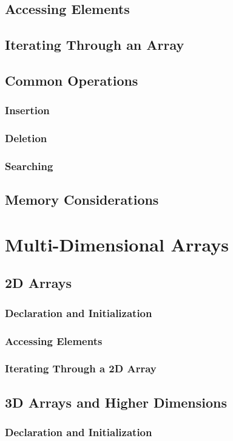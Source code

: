 \documentclass{book}
\begin{document}
	\subsection{Accessing Elements}
	\subsection{Iterating Through an Array}
	\subsection{Common Operations}
	\subsubsection{Insertion}
	\subsubsection{Deletion}
	\subsubsection{Searching}
	\subsection{Memory Considerations}
	
	\section{Multi-Dimensional Arrays}
	\subsection{2D Arrays}
	\subsubsection{Declaration and Initialization}
	\subsubsection{Accessing Elements}
	\subsubsection{Iterating Through a 2D Array}
	\subsection{3D Arrays and Higher Dimensions}
	\subsubsection{Declaration and Initialization}
\end{document}
